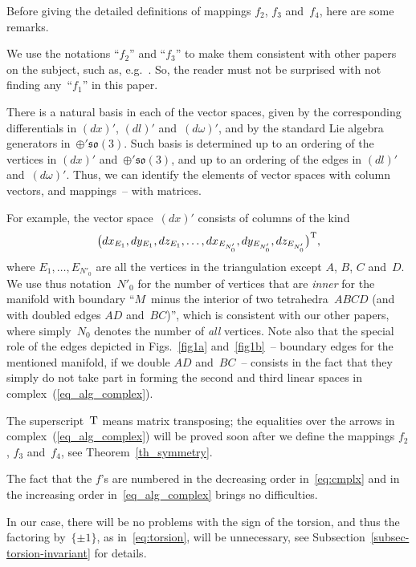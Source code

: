 Before giving the detailed def\/initions of mappings $f_2$, $f_3$ and~$f_4$, here are some remarks.
\begin{remark}
We use the notations ``$f_2$'' and ``$f_3$'' to make them consistent with other papers on the subject, such as, e.g.~\cite{M,M-thesis}. So, the reader must not be surprised with not f\/inding any~``$f_1$'' in this paper.
\end{remark}
\begin{remark}
\label{rem-b}
There is a natural basis in each of the vector spaces, given by the corresponding dif\/ferentials in $(dx)'$, $(dl)'$ and~$(d\omega)'$, and by the standard Lie algebra generators in~$\oplus' \mathfrak{so}(3)$. Such basis is determined up to an ordering of the vertices in $(dx)'$ and~$\oplus' \mathfrak{so}(3)$, and up to an ordering of the edges in $(dl)'$ and~$(d\omega)'$. Thus, we can identify the elements of vector spaces with column vectors, and mappings~-- with matrices.

For example, the vector space~$(dx)'$ consists of columns of the kind
\begin{displaymath}
\big(dx_{E_1}, dy_{E_1}, dz_{E_1}, \ldots, dx_{E_{N'_0}}, dy_{E_{N'_0}}, dz_{E_{N'_0}}\big)^{\rm T},
\end{displaymath}
where $E_1,\ldots,E_{N'_0}$ are all the vertices in the triangulation except $A$, $B$, $C$ and~$D$. We use thus notation~$N'_0$ for the number of vertices that are \emph{inner} for the manifold with boundary ``$M$~minus the interior of two tetrahedra~$ABCD$ (and with doubled edges $AD$ and~$BC$)'', which is consistent with our other papers, where simply~$N_0$ denotes the number of \emph{all} vertices. Note also that the special role of the edges depicted in Figs.~\ref{fig1a} and~\ref{fig1b}~-- boundary edges for the mentioned manifold, if we double $AD$ and~$BC$~-- consists in the fact that they simply do not take part in forming the second and third linear spaces in complex~(\ref{eq_alg_complex}).
\end{remark}
\begin{remark}
The superscript~$\rm T$ means matrix transposing; the equalities over the arrows in complex~(\ref{eq_alg_complex}) will be proved soon after we def\/ine the mappings $f_2$, $f_3$ and~$f_4$, see Theorem~\ref{th_symmetry}.
\end{remark}
\begin{remark}
The fact that the $f$'s are numbered in the decreasing order in~\eqref{eq:cmplx} and in the increasing order in~\eqref{eq_alg_complex} brings no dif\/f\/iculties.
\end{remark}
\begin{remark}
In our case, there will be no problems with the sign of the torsion, and thus the factoring by~$\{ \pm 1 \}$, as in~\eqref{eq:torsion}, will be unnecessary, see Subsection~\ref{subsec-torsion-invariant} for details.
\end{remark}

